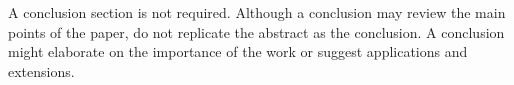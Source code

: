 \documentclass[letterpaper, 10 pt, conference]{ieeeconf}  %
\begin{document}
A conclusion section is not required. Although a conclusion may review the main points of the paper, do not replicate the abstract as the conclusion. A conclusion might elaborate on the importance of the work or suggest applications and extensions.

\addtolength{\textheight}{-12cm}   %




\end{document}
